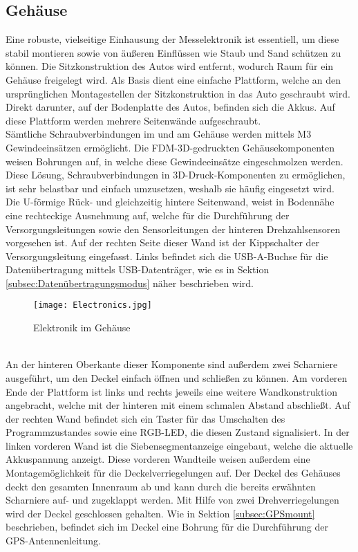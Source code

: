\subsection{Gehäuse}
\label{subsec:elekCasing}
Eine robuste, vielseitige Einhausung der Messelektronik ist essentiell, um diese stabil montieren sowie von äußeren Einflüssen wie Staub und Sand schützen zu können. Die Sitzkonstruktion des Autos wird entfernt, wodurch Raum für ein Gehäuse freigelegt wird. Als Basis dient eine einfache Plattform, welche an den ursprünglichen Montagestellen der Sitzkonstruktion in das Auto geschraubt wird. Direkt darunter, auf der Bodenplatte des Autos, befinden sich die Akkus. Auf diese Plattform werden mehrere Seitenwände aufgeschraubt.\\
Sämtliche Schraubverbindungen im und am Gehäuse werden mittels M3 Gewindeeinsätzen ermöglicht. Die \ac{FDM}-3D-gedruckten Gehäusekomponenten weisen Bohrungen auf, in welche diese Gewindeeinsätze eingeschmolzen werden. Diese Lösung, Schraubverbindungen in 3D-Druck-Komponenten zu ermöglichen, ist sehr belastbar und einfach umzusetzen, weshalb sie häufig eingesetzt wird. \\
Die U-förmige Rück- und gleichzeitig hintere Seitenwand, weist in Bodennähe eine rechteckige Ausnehmung auf, welche für die Durchführung der Versorgungsleitungen sowie den Sensorleitungen der hinteren Drehzahlsensoren vorgesehen ist. Auf der rechten Seite dieser Wand ist der Kippschalter der Versorgungsleitung eingefasst. Links befindet sich die \ac{USB}-A-Buchse für die Datenübertragung mittels \ac{USB}-Datenträger, wie es in Sektion \ref{subsec:Datenübertragungsmodus} näher beschrieben wird.
\begin{figure}[h]
\centering
\texttt{[image: Electronics.jpg]}
\caption{Elektronik im Gehäuse}
\label{fig:elekCase}
\end{figure}
\\
An der hinteren Oberkante dieser Komponente sind außerdem zwei Scharniere ausgeführt, um den Deckel einfach öffnen und schließen zu können. Am vorderen Ende der Plattform ist links und rechts jeweils eine weitere Wandkonstruktion angebracht, welche mit der hinteren mit einem schmalen Abstand abschließt. Auf der rechten Wand befindet sich ein Taster für das Umschalten des Programmzustandes sowie eine \ac{RGB}-\ac{LED}, die diesen Zustand signalisiert. In der linken vorderen Wand ist die Siebensegmentanzeige eingebaut, welche die aktuelle Akkuspannung anzeigt. Diese vorderen Wandteile weisen außerdem eine Montagemöglichkeit für die Deckelverriegelungen auf. Der Deckel des Gehäuses deckt den gesamten Innenraum ab und kann durch die bereits erwähnten Scharniere auf- und zugeklappt werden. Mit Hilfe von zwei Drehverriegelungen wird der Deckel geschlossen gehalten. Wie in Sektion \ref{subsec:GPSmount} beschrieben, befindet sich im Deckel eine Bohrung für die Durchführung der GPS-Antennenleitung.\\
